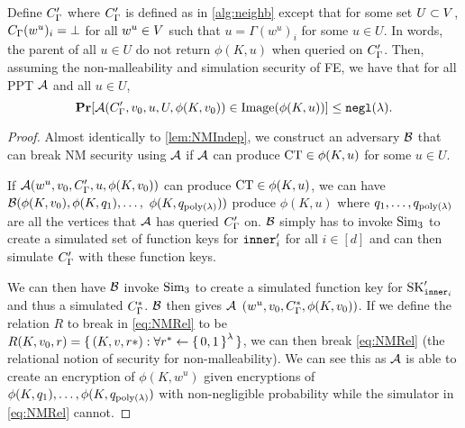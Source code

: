 \begin{lemma}
		\label{lem:NMIndepA}
		Define $C_\Gamma'$ where $C_\Gamma'$ is defined as in \cref{alg:neighb} except that
		for some set $U \subset V$, $C_\Gamma(w^u)_i = \bot$ for all $w^u \in V$ such that $u = \Gamma(w^u)_i$ for some $u \in U$.
		In words, the parent of all $u \in U$ do not return $\phi(K, u)$ when queried on $C_\Gamma'$.
		Then, assuming the non-malleability and simulation security of FE, we have that for all PPT $\mathcal{A}$
		and all $u \in U$,
		\begin{equation}
			\operatorname*{\mathbf{Pr}}[\mathcal{A}(C_\Gamma', v_0, u, U, \phi(K, v_0)) \in \text{Image}(\phi(K, u))] \leq \texttt{negl}(\lambda).
		\end{equation}
		\begin{proof}
			Almost identically to \cref{lem:NMIndep}, we construct an adversary $\mathcal{B}$ that can break NM security using $\mathcal{A}$ if $\mathcal{A}$ can
			produce $\text{CT} \in \phi(K, u)$ for some $u \in U$.
			
			If $\mathcal{A}(w^u, v_0, C_\Gamma', u, \phi(K, v_0))$ can produce $\text{CT} \in \phi(K, u)$,
			we can have $\mathcal{B}(\phi(K, v_0), \phi(K, q_1), \dots,$ $ \phi(K,q_{\operatorname{poly}(\lambda)}))$ 
			produce $\phi(K, u)$ where $q_1, \dots, q_{\operatorname{poly}(\lambda)}$ are all the vertices that $\mathcal{A}$ has queried $C_\Gamma'$ on.
			$\mathcal{B}$ simply has to invoke $\text{Sim}_3$ to create a simulated set of function keys for $\texttt{inner}_i'$ for all $i \in [d]$
			and can then simulate $C_\Gamma'$ with these function keys.

			We can then have $\mathcal{B}$ invoke $\text{Sim}_3$ to create a simulated function key for $\text{SK}_{\texttt{inner}_i}'$
			and thus a simulated $C_\Gamma^{*}$.
			$\mathcal{B}$ then gives $\mathcal{A}$ $(w^u, v_0, C_\Gamma^{*}, \phi(K, v_0))$.
			If we define the relation $R$ to break in \cref{eq:NMRel} to be $R(K, v_0, r) = \set{(K, v, r*) : \forall r^* \gets \set{0, 1}^\lambda}$,
			we can then break \cref{eq:NMRel} (the relational notion of security for non-malleability).
			We can see this as $\mathcal{A}$ is able to create an encryption of $\phi(K, w^u)$
			given encryptions of $\phi(K, q_1), \dots, \phi(K, q_{\operatorname{poly}(\lambda)})$
			with non-negligible probability while the simulator 
			in \cref{eq:NMRel} cannot.
		\end{proof}
\end{lemma}
